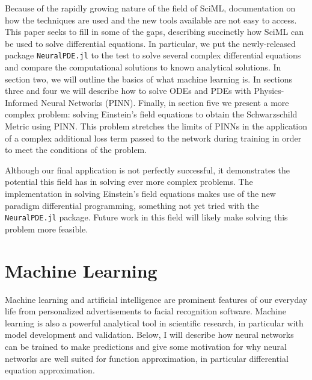 \documentclass{CUP-JNL-DTM}%
\theoremstyle{definition}
\numberwithin{equation}{section}
\begin{document}
Because of the rapidly growing nature of the field of SciML, documentation on how the techniques are used and the new tools available are not easy to access. This paper seeks to fill in some of the gaps, describing succinctly how SciML can be used to solve differential equations. In particular, we put the newly-released package \texttt{NeuralPDE.jl} to the test to solve several complex differential equations and compare the computational solutions to known analytical solutions. In section two, we will outline the basics of what machine learning is. In sections three and four we will describe how to solve ODEs and PDEs with Physics-Informed Neural Networks (PINN). Finally, in section five we present a more complex problem: solving Einstein's field equations to obtain the Schwarzschild Metric using PINN. This problem stretches the limits of PINNs in the application of a complex additional loss term passed to the network during training in order to meet the conditions of the problem. 

Although our final application is not perfectly successful, it demonstrates the potential this field has in solving ever more complex problems. The implementation in solving Einstein's field equations makes use of the new paradigm differential programming, something not yet tried with the \texttt{NeuralPDE.jl} package. Future work in this field will likely make solving this problem more feasible. 


\vspace{-0.5cm}

\section{Machine Learning}

Machine learning and artificial intelligence are prominent features of our everyday life from personalized advertisements to facial recognition software. Machine learning is also a powerful analytical tool in scientific research, in particular with model development and validation. Below, I will describe how neural networks can be trained to make predictions and give some motivation for why neural networks are well suited for function approximation, in particular differential equation approximation. 

\end{document}
